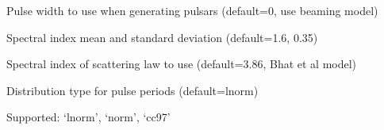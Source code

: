 \documentclass[letterpaper,10pt,english]{sphinxmanual}
\begin{document}
\begin{fulllineitems}
\label{\detokenize{cmd-line-docs:cmdoption-populate.py-w}}
\pysigstartsignatures
\pysigline
{}
\pysigstopsignatures
\sphinxAtStartPar
Pulse width to use when generating pulsars (default=0, use beaming model)

\end{fulllineitems}


\begin{fulllineitems}
\label{\detokenize{cmd-line-docs:cmdoption-populate.py-si}}
\pysigstartsignatures
\pysigline
{}
\pysigstopsignatures
\sphinxAtStartPar
Spectral index mean and standard deviation (default=\sphinxhyphen{}1.6, 0.35)

\end{fulllineitems}


\begin{fulllineitems}
\label{\detokenize{cmd-line-docs:cmdoption-populate.py-sc}}
\pysigstartsignatures
\pysigline
{}
\pysigstopsignatures
\sphinxAtStartPar
Spectral index of scattering law to use (default=\sphinxhyphen{}3.86, Bhat et al model)

\end{fulllineitems}


\begin{fulllineitems}
\label{\detokenize{cmd-line-docs:cmdoption-populate.py-pdist}}
\pysigstartsignatures
\pysigline
{}
\pysigstopsignatures
\sphinxAtStartPar
Distribution type for pulse periods (default=lnorm)

\sphinxAtStartPar
Supported: ‘lnorm’, ‘norm’, ‘cc97’

\end{fulllineitems}
\end{document}
